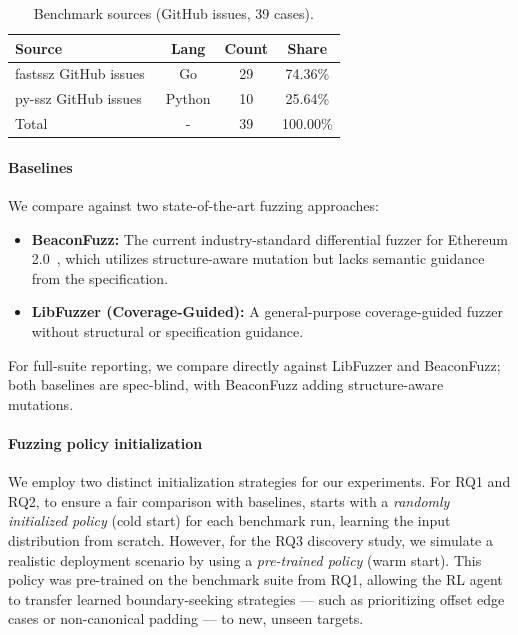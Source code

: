 \begin{table}
\centering
\caption{Benchmark sources (GitHub issues, 39 cases).}
\label{tab:bench-summary}
\small
\begin{tabular}{lccc}
\toprule
\textbf{Source} & \textbf{Lang} & \textbf{Count} & \textbf{Share} \\
\midrule
fastssz GitHub issues~\cite{fastssz} & Go & 29 & 74.36\% \\
py-ssz GitHub issues~\cite{pyssz} & Python & 10 & 25.64\% \\
\midrule
Total & - & 39 & 100.00\% \\
\bottomrule
\end{tabular}
\end{table}


\paragraph{Baselines}
We compare \tool against two state-of-the-art fuzzing approaches:
\begin{itemize}
    \item \textbf{BeaconFuzz:} The current industry-standard differential fuzzer for Ethereum 2.0~\cite{beaconfuzz}, which utilizes structure-aware mutation but lacks semantic guidance from the specification.
    \item \textbf{LibFuzzer (Coverage-Guided):} A general-purpose coverage-guided fuzzer~\cite{libfuzzer} without structural or specification guidance.
\end{itemize}
For full-suite reporting, we compare \tool directly against LibFuzzer and BeaconFuzz; both baselines are spec-blind, with BeaconFuzz adding structure-aware mutations.


\paragraph{Fuzzing policy initialization}
We employ two distinct initialization strategies for our experiments. For RQ1 and RQ2, to ensure a fair comparison with baselines, \tool starts with a \emph{randomly initialized policy} (cold start) for each benchmark run, learning the input distribution from scratch. However, for the RQ3 discovery study, we simulate a realistic deployment scenario by using a \emph{pre-trained policy} (warm start). This policy was pre-trained on the benchmark suite from RQ1, allowing the RL agent to transfer learned boundary-seeking strategies --- such as prioritizing offset edge cases or non-canonical padding --- to new, unseen targets.

